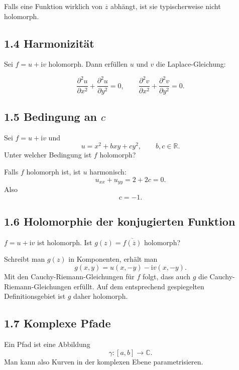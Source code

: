 \documentclass[11pt,a4paper]{article}
\newcommand{\C}{\mathbb C}
\newcommand{\R}{\mathbb R}
\newcommand{\ii}{\mathrm i}
\begin{document}
\begin{importantbox}
Falls eine Funktion wirklich von $\overline z$ abhängt, ist sie typischerweise nicht holomorph.
\end{importantbox}

\subsection{1.4 Harmonizität}
Sei $f=u+\ii v$ holomorph. Dann erfüllen $u$ und $v$ die Laplace-Gleichung:
\begin{importantbox}
\[
\frac{\partial^2u}{\partial x^2}+\frac{\partial^2u}{\partial y^2}=0,
\qquad
\frac{\partial^2v}{\partial x^2}+\frac{\partial^2v}{\partial y^2}=0.
\]
\end{importantbox}

\subsection{1.5 Bedingung an $c$}
\begin{fragebox}
Sei $f=u+\ii v$ und
\[
u=x^2+bxy+cy^2,
\qquad b,c\in\R.
\]
Unter welcher Bedingung ist $f$ holomorph?
\end{fragebox}
\begin{antwortbox}
Falls $f$ holomorph ist, ist $u$ harmonisch:
\[
u_{xx}+u_{yy}=2+2c=0.
\]
Also
\[
c=-1.
\]
\end{antwortbox}

\subsection{1.6 Holomorphie der konjugierten Funktion}
\begin{fragebox}
$f=u+\ii v$ ist holomorph. Ist $g(z)=\overline{f(\overline z)}$ holomorph?
\end{fragebox}
\begin{antwortbox}
Schreibt man $g(z)$ in Komponenten, erhält man
\[
g(x,y)=u(x,-y)-\ii v(x,-y).
\]
Mit den Cauchy-Riemann-Gleichungen für $f$ folgt, dass auch $g$ die Cauchy-Riemann-Gleichungen erfüllt. Auf dem entsprechend gespiegelten Definitionsgebiet ist $g$ daher holomorph.
\end{antwortbox}

\subsection{1.7 Komplexe Pfade}
Ein Pfad ist eine Abbildung
\[
\gamma:[a,b]\to\C.
\]
Man kann also Kurven in der komplexen Ebene parametrisieren.
\end{document}
